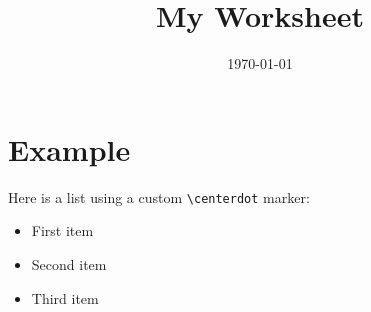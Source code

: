 \documentclass[12pt]{article}
\title{\textbf{My Worksheet}}
\author{}
\date{\today}
\newcommand{\mycenterdot}{\hspace{1em}$\cdot$\hspace{1em}}
\newcommand{\myitemlist}[1]{%
    \begin{itemize}
        \renewcommand{\labelitemi}{\mycenterdot} %
        #1 %
    \end{itemize}%
}
\begin{document}
\maketitle
\section*{Example} 
Here is a list using a custom \texttt{\textbackslash centerdot} marker:
\myitemlist{
    \item First item
    \item Second item
    \item Third item
}
\end{document}
